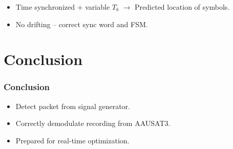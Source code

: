 \begin{frame}
{\begin{itemize}
        \item Time synchronized $+$ variable $T_b$ $\rightarrow$ \textcolor{red!80!black}{Predicted location of symbols}.
        \item No drifting -- correct sync word and FSM.
        \end{itemize}
    }
\end{frame}


\section{Conclusion} \label{sec:conclusion}
\begin{frame} \frametitle{Conclusion}
    \begin{itemize}
    \item Detect packet from signal generator.
    \item Correctly demodulate recording from AAUSAT3.
    \item Prepared for real-time optimization.
    \end{itemize}
\end{frame}


